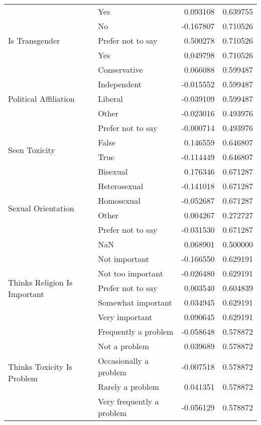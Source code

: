 \begin{longtable}{llrr}
 & Yes & 0.093108 & 0.639755 \\
\cline{1-4}
\multirow[t]{3}{*}{Is Transgender} & No & -0.167807 & 0.710526 \\
 & Prefer not to say & 0.500278 & 0.710526 \\
 & Yes & 0.049798 & 0.710526 \\
\cline{1-4}
\multirow[t]{5}{*}{Political Affiliation} & Conservative & 0.066088 & 0.599487 \\
 & Independent & -0.015552 & 0.599487 \\
 & Liberal & -0.039109 & 0.599487 \\
 & Other & -0.023016 & 0.493976 \\
 & Prefer not to say & -0.000714 & 0.493976 \\
\cline{1-4}
\multirow[t]{2}{*}{Seen Toxicity} & False & 0.146559 & 0.646807 \\
 & True & -0.114449 & 0.646807 \\
\cline{1-4}
\multirow[t]{6}{*}{Sexual Orientation} & Bisexual & 0.176346 & 0.671287 \\
 & Heterosexual & -0.141018 & 0.671287 \\
 & Homosexual & -0.052687 & 0.671287 \\
 & Other & 0.004267 & 0.272727 \\
 & Prefer not to say & -0.031530 & 0.671287 \\
 & NaN & 0.068901 & 0.500000 \\
\cline{1-4}
\multirow[t]{5}{*}{Thinks Religion Is Important} & Not important & -0.166550 & 0.629191 \\
 & Not too important & -0.026480 & 0.629191 \\
 & Prefer not to say & 0.003540 & 0.604839 \\
 & Somewhat important & 0.034945 & 0.629191 \\
 & Very important & 0.090645 & 0.629191 \\
\cline{1-4}
\multirow[t]{5}{*}{Thinks Toxicity Is Problem} & Frequently a problem & -0.058648 & 0.578872 \\
 & Not a problem & 0.039689 & 0.578872 \\
 & Occasionally a problem & -0.007518 & 0.578872 \\
 & Rarely a problem & 0.041351 & 0.578872 \\
 & Very frequently a problem & -0.056129 & 0.578872 \\
\cline{1-4}
\end{longtable}

